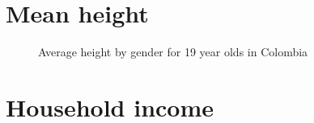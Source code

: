 \documentclass[
  ignorenonframetext,
]{beamer}
\begin{document}
\section{Mean height}\label{mean-height}

\begin{frame}{}
\label{section-4}
\begin{figure}


\caption{\label{fig-avg-height-19-year-old-col}Average height by gender
for 19 year olds in Colombia}

\end{figure}%
\end{frame}

\section{Household income}\label{household-income}
\end{document}

